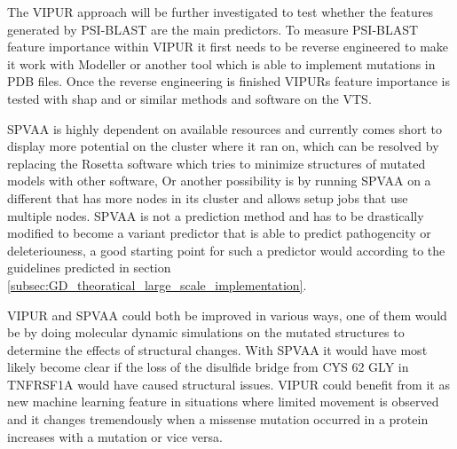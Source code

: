 The VIPUR approach will be further investigated to test whether the features generated by PSI-BLAST are the main predictors. To measure PSI-BLAST feature importance within VIPUR it first needs to be reverse engineered to make it work with Modeller or another tool which is able to implement mutations in PDB files. Once the reverse engineering is finished VIPURs feature importance is tested with shap\cite{slundberg_slundberg/shap:_nodate, strumbelj_explaining_2014, ribeiro_why_2016, shrikumar_learning_2017, datta_algorithmic_nodate, bach_pixel-wise_2015, datadive_interpreting_nodate} and or similar methods and software on the VTS.

SPVAA is highly dependent on available resources and currently comes short to display more potential on the cluster where it ran on, which can be resolved by replacing the Rosetta software which tries to minimize structures of mutated models with other software, Or another possibility is by running SPVAA on a different that has more nodes in its cluster and allows setup jobs that use multiple nodes. SPVAA is not a prediction method and has to be drastically modified to become a variant predictor that is able to predict pathogencity or deleteriouness, a good starting point for such a predictor would according to the guidelines predicted in section \ref{subsec:GD_theoratical_large_scale_implementation}.

VIPUR and SPVAA could both be improved in various ways, one of them would be by doing molecular dynamic simulations on the mutated structures to determine the effects of structural changes. With SPVAA it would have most likely become clear if the loss of the disulfide bridge from CYS 62 GLY  in TNFRSF1A would have caused structural issues. VIPUR could benefit from it as new machine learning feature in situations where limited movement is observed and it changes tremendously when a missense mutation occurred in a protein increases with a mutation or vice versa.



